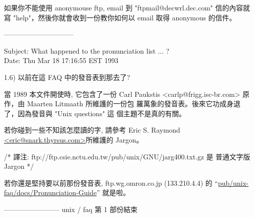 \documentclass{letter}
\begin{document}
\begin{CJK}{Bg5}{ming}
	如果你不能使用 anonymouse ftp,  email 到 "ftpmail@decwrl.dec.com" 
	信的內容就寫 "help"，然後你就會收到一份教你如何以 email 取得 
	anonymous 的信件。

------------------------------

Subject: What happened to the pronunciation list ... ? \\
Date: Thu Mar 18 17:16:55 EST 1993

1.6)  以前在這 FAQ 中的發音表到那去了?

	當 1989 本文件開使時, 它包含了一份 Carl Paukstis 
	<carlp@frigg.isc-br.com> 原作，由 Maarten Litmaath 所維護的一份包
	羅萬象的發音表。後來它功成身退了，因為發音與 "Unix questions" 這
	個主題不是真的有關。

	若你碰到一些不知該怎麼讀的字, 請參考 Eric S. Raymond
	\url{<eric@snark.thyrsus.com>}所維護的 Jargon。

        /* 譯注: ftp://ftp.csie.nctu.edu.tw/pub/unix/GNU/jarg400.txt.gz 是 
                 普通文字版 Jargon */

	若你還是堅持要以前那份發音表, ftp.wg.omron.co.jp (133.210.4.4) 的 
	``\url{pub/unix-faq/docs/Pronunciation-Guide}'' 就是啦。

------------------------
unix / faq 第 1 部份結束

\end{CJK}
\end{document}
